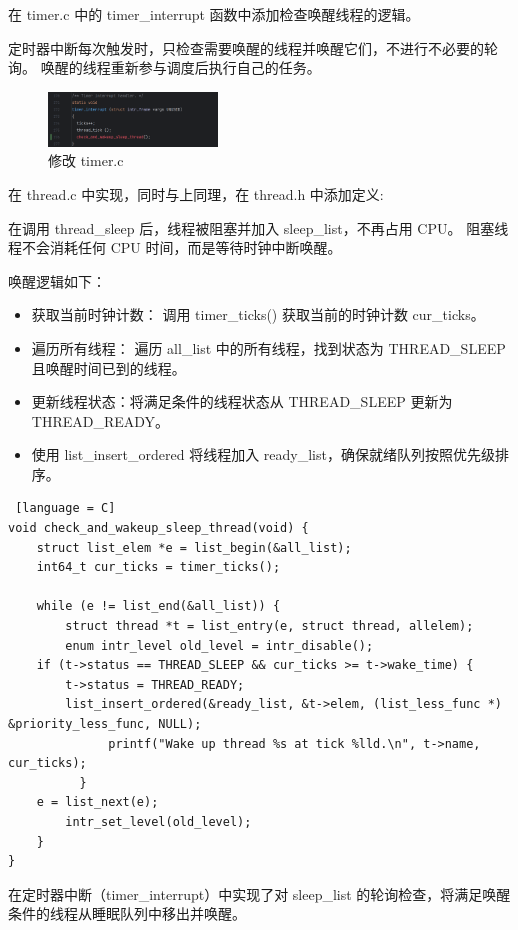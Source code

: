 在 timer.c 中的 timer\_interrupt 函数中添加检查唤醒线程的逻辑。

定时器中断每次触发时，只检查需要唤醒的线程并唤醒它们，不进行不必要的轮询。
唤醒的线程重新参与调度后执行自己的任务。

\begin{figure}[H]
  \centering
  \includegraphics[width=0.4\textwidth]{img4/timer_interrupt.png}
  \caption{修改 timer.c}
  \label{fig:pintos}
\end{figure}

在 thread.c 中实现，同时与上同理，在 thread.h 中添加定义:

在调用 thread\_sleep 后，线程被阻塞并加入 sleep\_list，不再占用 CPU。
阻塞线程不会消耗任何 CPU 时间，而是等待时钟中断唤醒。

唤醒逻辑如下：

\begin{itemize}
  \item 获取当前时钟计数： 调用 timer\_ticks() 获取当前的时钟计数 cur\_ticks。
  \item 遍历所有线程： 遍历 all\_list 中的所有线程，找到状态为 THREAD\_SLEEP 且唤醒时间已到的线程。
  \item 更新线程状态：将满足条件的线程状态从 THREAD\_SLEEP 更新为 THREAD\_READY。
  \item 使用 list\_insert\_ordered 将线程加入 ready\_list，确保就绪队列按照优先级排序。
\end{itemize}

\begin{lstlisting} [language = C]
void check_and_wakeup_sleep_thread(void) {
	struct list_elem *e = list_begin(&all_list);
	int64_t cur_ticks = timer_ticks();

	while (e != list_end(&all_list)) {
		struct thread *t = list_entry(e, struct thread, allelem);
		enum intr_level old_level = intr_disable();
    if (t->status == THREAD_SLEEP && cur_ticks >= t->wake_time) {
        t->status = THREAD_READY;
        list_insert_ordered(&ready_list, &t->elem, (list_less_func *) &priority_less_func, NULL);
			  printf("Wake up thread %s at tick %lld.\n", t->name, cur_ticks);
		  }
    e = list_next(e);
		intr_set_level(old_level);
	}
}
\end{lstlisting}

在定时器中断（timer\_interrupt）中实现了对 sleep\_list 的轮询检查，将满足唤醒条件的线程从睡眠队列中移出并唤醒。

